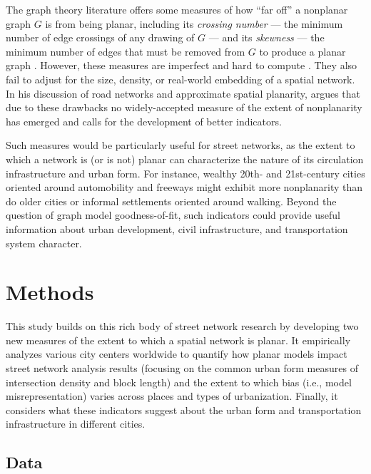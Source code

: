\documentclass[Afour,sageh,times]{sagej}
\begin{document}
The graph theory literature offers some measures of how \enquote{far off} a nonplanar graph $G$ is from being planar, including its \emph{crossing number} --- the minimum number of edge crossings of any drawing of $G$ --- and its \emph{skewness} --- the minimum number of edges that must be removed from $G$ to produce a planar graph \citep{liebers_planarizing_2001,chimani_non-planar_2009}. However, these measures are imperfect and hard to compute \citep{szekely_successful_2004,chimani_vertex_2012}. They also fail to adjust for the size, density, or real-world embedding of a spatial network. In his discussion of road networks and approximate spatial planarity, \citet[p.~133]{newman_networks:_2010} argues that due to these drawbacks no widely-accepted measure of the extent of nonplanarity has emerged and calls for the development of better indicators.

Such measures would be particularly useful for street networks, as the extent to which a network is (or is not) planar can characterize the nature of its circulation infrastructure and urban form. For instance, wealthy 20th- and 21st-century cities oriented around automobility and freeways might exhibit more nonplanarity than do older cities or informal settlements oriented around walking. Beyond the question of graph model goodness-of-fit, such indicators could provide useful information about urban development, civil infrastructure, and transportation system character.



\section{Methods}

This study builds on this rich body of street network research by developing two new measures of the extent to which a spatial network is planar. It empirically analyzes various city centers worldwide to quantify how planar models impact street network analysis results (focusing on the common urban form measures of intersection density and block length) and the extent to which bias (i.e., model misrepresentation) varies across places and types of urbanization. Finally, it considers what these indicators suggest about the urban form and transportation infrastructure in different cities.

\subsection{Data}
\end{document}
